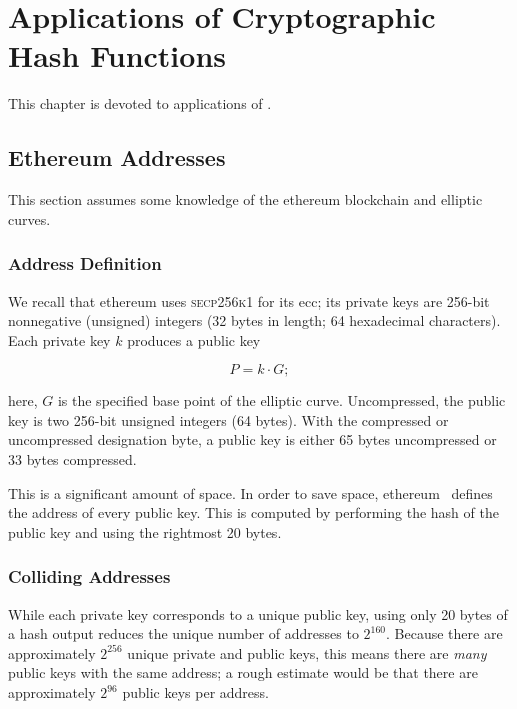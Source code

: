 \chapter{Applications of Cryptographic Hash Functions}
\label{chap:hash_applications}

This chapter is devoted to applications of .



\section{Ethereum Addresses}

This section assumes some knowledge of the \gls{ethereum} blockchain and
\glspl{elliptic curve}.

\subsection{Address Definition}

We recall that \gls{ethereum} uses \textsc{secp256k1}
for its \gls{ecc};
its private keys are 256-bit nonnegative (unsigned) integers
(32 bytes in length; 64 hexadecimal characters).
Each private key $k$ produces a public key

\begin{equation}
    P = k\cdot G;
\end{equation}

\noindent
here, $G$ is the specified base point of the \gls{elliptic curve}.
Uncompressed, the public key is two 256-bit unsigned integers
(64 bytes).
With the compressed or uncompressed designation byte,
a public key is either 65 bytes uncompressed or 33 bytes compressed.

This is a significant amount of space.
In order to save space, \gls{ethereum}~\cite[Eq.~314]{EthereumYellowpaper}
defines the address of every public key.
This is computed by performing the \Keccak{} hash of the public key
and using the rightmost 20 bytes.

\subsection{Colliding Addresses}

While each private key corresponds to a unique public key,
using only 20 bytes of a hash output reduces the unique
number of addresses to $2^{160}$.
Because there are approximately $2^{256}$ unique private and public keys,
this means there are \emph{many} public keys with the same address;
a rough estimate would be that there are approximately $2^{96}$ public keys
per address.

